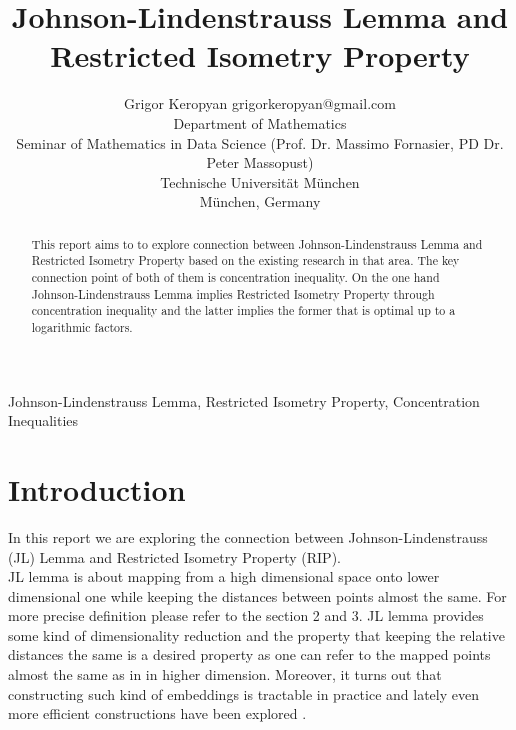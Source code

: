 \documentclass[twoside,11pt]{article}
\begin{document}
\title{Johnson-Lindenstrauss Lemma and Restricted Isometry Property}

\author{\name Grigor Keropyan \email grigorkeropyan@gmail.com \\
      \addr Department of Mathematics\\
      Seminar of Mathematics in Data Science (Prof. Dr. Massimo Fornasier, PD Dr. Peter Massopust) \\
      Technische Universität München\\
      München, Germany
    }

\maketitle

\begin{abstract}
This report aims to to explore connection between Johnson-Lindenstrauss Lemma and Restricted Isometry Property based on the existing research in that area. The key connection point of both of them is concentration inequality. On the one hand Johnson-Lindenstrauss Lemma implies Restricted Isometry Property through concentration inequality and the latter implies the former that 
is optimal up to a logarithmic factors.  \\
\end{abstract} 

\begin{keywords}
  Johnson-Lindenstrauss Lemma, Restricted Isometry Property, Concentration Inequalities
\end{keywords}

\section{Introduction}

In this report we are exploring the connection between Johnson-Lindenstrauss (JL) Lemma and Restricted Isometry Property (RIP). \\

JL lemma is about mapping from a high dimensional space onto lower dimensional one while keeping the distances between points almost the same. For more precise definition please refer to the section 2 and 3. JL lemma provides some kind of dimensionality reduction and the property that keeping the relative distances the same is a desired property as one can refer to the mapped points almost the same as in in higher dimension. Moreover, it turns out that constructing such kind of embeddings is tractable in practice and lately even more efficient constructions have been explored \citep{Khramer}. \\
\end{document}
